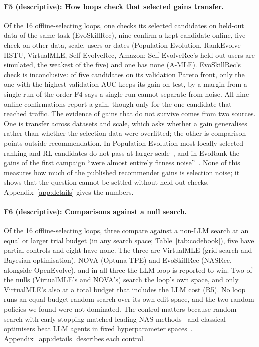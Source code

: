\documentclass[sigconf,nonacm]{acmart}
\begin{document}
\paragraph{F5 (descriptive): How loops check that selected gains transfer.} Of the 16 offline-selecting loops, one
checks its selected candidates on held-out data of the same task (EvoSkillRec), nine confirm a kept candidate online, five check on other data, scale, users or dates (Population Evolution, RankEvolve-HSTU, VirtualMLE, Self-EvolveRec, Amazon; Self-EvolveRec's held-out users are simulated, the weakest of the five) and one has none (A-MLE). EvoSkillRec's check is inconclusive: of five candidates on its validation Pareto front, only the one with the highest validation AUC keeps its gain on test, by a margin from a single run of the order F4 says a single run cannot separate from noise. All nine online confirmations report a gain, though only for the one candidate that reached traffic. The evidence of gains that do not survive comes from two sources. One is transfer across datasets and scale, which asks whether a gain generalises rather than whether the selection data were overfitted; the other is comparison points outside recommendation. In Population Evolution most locally selected ranking and RL candidates do not pass at larger scale~\cite{peng2026population}, and in EvoRank the gains of the first campaign ``were almost entirely fitness noise''~\cite{patel2026evorank}. None of this measures how much of the
published recommender gains is selection noise; it shows that the question cannot be settled without held-out checks. Appendix~\ref{app:details} gives the numbers.

\paragraph{F6 (descriptive): Comparisons against a null search.} Of the 16 offline-selecting loops, three compare against a non-LLM search at an equal or
larger trial budget (in any search space; Table~\ref{tab:codebook}), five have partial controls and eight have none. The three are VirtualMLE (grid search and Bayesian optimisation), NOVA (Optuna-TPE) and EvoSkillRec (NASRec, alongside OpenEvolve), and in all three the LLM loop is reported to win. Two of the nulls (VirtualMLE's and NOVA's) search the loop's own space, and only VirtualMLE's also at a total budget that includes the LLM cost (R5). No loop runs an equal-budget random search over its own edit space, and the two random policies we found were not dominated. The control matters because random
search with early stopping matched leading NAS methods~\cite{li2019randomnas} and classical optimisers beat LLM agents in fixed
hyperparameter spaces~\cite{ferreira2026hpo,rodrigues2026llmhpo}. Appendix~\ref{app:details} describes each control.
\end{document}
